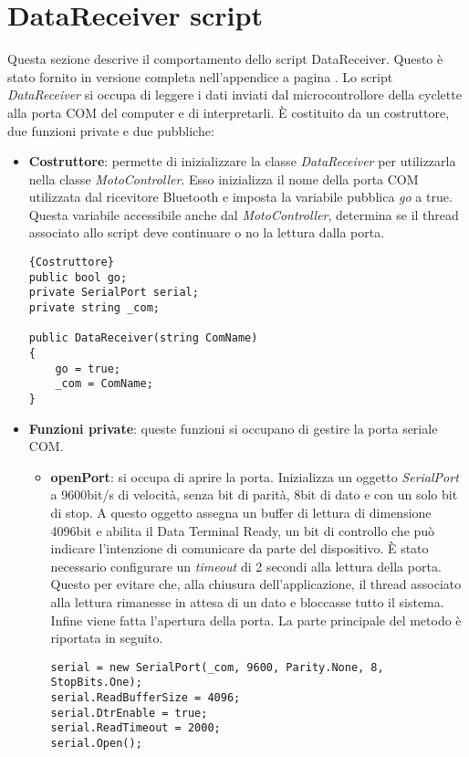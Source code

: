 \section{DataReceiver script}
Questa sezione descrive il comportamento dello script DataReceiver. Questo è stato fornito in versione completa nell'appendice  a pagina \pageref{receiver}. Lo script \textit{DataReceiver} si occupa di leggere i dati inviati dal microcontrollore della cyclette alla porta COM del computer e di interpretarli. È costituito da un costruttore, due funzioni private e due pubbliche:
\begin{itemize}
  \item \textbf{Costruttore}: permette di inizializzare la classe \textit{DataReceiver} per utilizzarla nella classe \textit{MotoController}. Esso inizializza il nome della porta COM utilizzata dal ricevitore Bluetooth e imposta la variabile pubblica \textit{go} a true. Questa variabile accessibile anche dal \textit{MotoController}, determina se il thread associato allo script deve continuare o no la lettura dalla porta.
\begin{lstlisting}{Costruttore}
public bool go;
private SerialPort serial;
private string _com;

public DataReceiver(string ComName) 
{
	go = true;
	_com = ComName;
}
\end{lstlisting}

  \item \textbf{Funzioni private}: queste funzioni si occupano di gestire la porta seriale COM.
\begin{itemize}
   \item \textbf{openPort}: si occupa di aprire la porta. Inizializza un oggetto \textit{SerialPort} a 9600bit/s di velocità, senza bit di parità, 8bit di dato e con un solo bit di stop. A questo oggetto assegna un buffer di lettura di dimensione 4096bit e abilita il Data Terminal Ready, un bit di controllo che può indicare l'intenzione di comunicare da parte del dispositivo. È stato necessario configurare un \textit{timeout} di 2 secondi alla lettura della porta. Questo per evitare che, alla chiusura dell'applicazione, il thread associato alla lettura rimanesse in attesa di un dato e bloccasse tutto il sistema. Infine viene fatta l'apertura della porta. La parte principale del metodo è riportata in seguito.
\begin{lstlisting}
serial = new SerialPort(_com, 9600, Parity.None, 8, StopBits.One);
serial.ReadBufferSize = 4096;
serial.DtrEnable = true;
serial.ReadTimeout = 2000; 		
serial.Open();
\end{lstlisting}


\end{itemize}
\end{itemize}
